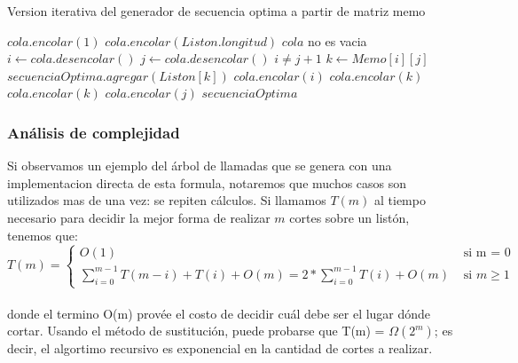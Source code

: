 \begin{algorithm}[H]
\caption{Version iterativa del generador de secuencia optima a partir de matriz memo} 
	\begin{codebox}
		\li $cola.encolar(1)$ 
		\li $cola.encolar(Liston.longitud)$
		\li \While $cola$ no es vacia
		\li	\Do
			 	$i \gets cola.desencolar()$
		\li 	$j \gets cola.desencolar()$
		\li 	\If $i \not = j +1$
		\li		\Then	
				 		$k \gets Memo[i][j]$
		\li			$secuenciaOptima.agregar(Liston[k])$
		\li	 		$cola.encolar(i)$ 
		\li		 	$cola.encolar(k)$ 
		\li 		$cola.encolar(k)$ 
		\li			$cola.encolar(j)$ 
				\End
				\End
		\li \Return $secuenciaOptima$	
		\End
	\end{codebox}
	\label{ej3SecuOptima}
\end{algorithm}

\subsubsection{An\'alisis de complejidad}

 Si observamos un ejemplo del \'arbol de llamadas que se genera con una implementacion directa de esta formula,
 notaremos que muchos casos son utilizados mas de una vez: se repiten c\'alculos. 
Si llamamos $T(m)$  al tiempo necesario para decidir la mejor forma de realizar $m$ cortes sobre un list\'on, tenemos que: \\

 $$ T(m) =
	 \begin{cases}
		 O(1) 	& \mbox{ si m = 0} \\
		 \sum_{i = 0}^{m-1}{T(m-i)+T(i)} + O(m) = 2 * \sum_{i = 0}^{m-1}{T(i)} + O(m) & \mbox{ si } m \geq 1
	 \end{cases}
 $$
 \\

 donde el termino O(m) prov\'ee el costo de decidir cu\'al debe ser el lugar d\'onde cortar.
 Usando el m\'etodo de sustituci\'on, puede probarse que T(m) = $\Omega(2^m)$; es decir,
 el algortimo recursivo es exponencial en la cantidad de cortes a realizar.

